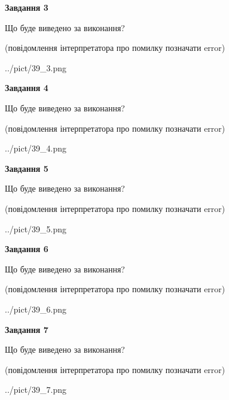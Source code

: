\documentclass[12pt, ukrainian]{article}
\begin{document}
{\begin {large}
{\begin {center}\textbf{Завдання 3}\end {center}}\par
Що буде виведено за виконання?\par
 (повідомлення інтерпретатора про помилку позначати error)\par
\begin{center}
	{../pict/39_3.png}
\end{center}
\newpage

{\begin {center}\textbf{Завдання 4}\end {center}}\par
Що буде виведено за виконання?\par
 (повідомлення інтерпретатора про помилку позначати error)\par
\begin{center}
	{../pict/39_4.png}
\end{center}
\newpage

{\begin {center}\textbf{Завдання 5}\end {center}}\par
Що буде виведено за виконання?\par
 (повідомлення інтерпретатора про помилку позначати error)\par
\begin{center}
	{../pict/39_5.png}
\end{center}
\newpage

{\begin {center}\textbf{Завдання 6}\end {center}}\par
Що буде виведено за виконання?\par
 (повідомлення інтерпретатора про помилку позначати error)\par
\begin{center}
	{../pict/39_6.png}
\end{center}
\newpage

{\begin {center}\textbf{Завдання 7}\end {center}}\par
Що буде виведено за виконання?\par
 (повідомлення інтерпретатора про помилку позначати error)\par
\begin{center}
	{../pict/39_7.png}
\end{center}
\newpage


\end{large}}
\end{document}
